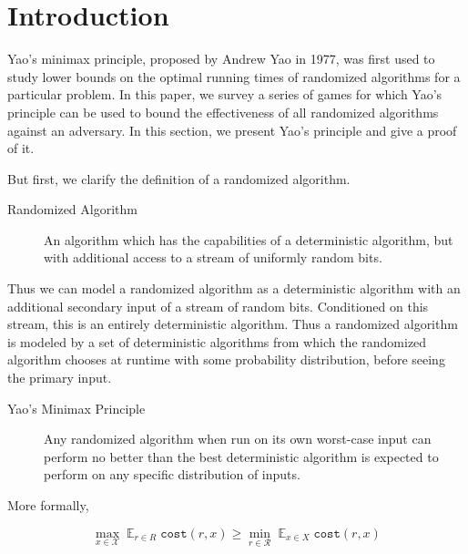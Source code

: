 \newcommand{\Expected}{\displaystyle\mathop{\mathds{E}}}
\newcommand{\argmin}{\displaystyle\mathop{\text{arg\;min}}}

\section{Introduction}

Yao's minimax principle, proposed by Andrew Yao in 1977, was first used to study lower bounds on the optimal running times of randomized algorithms for a particular problem. In this paper, we survey a series of games for which Yao's principle can be used to bound the effectiveness of all randomized algorithms against an adversary.
In this section, we present Yao's principle and give a proof of it.

But first, we clarify the definition of a randomized algorithm.

\begin{description}
	\item[Randomized Algorithm] An algorithm which has the capabilities of a deterministic algorithm, but with additional access to a stream of uniformly random bits.
\end{description}

Thus we can model a randomized algorithm as a deterministic algorithm with an additional secondary input of a stream of random bits. Conditioned on this stream, this is an entirely deterministic algorithm. Thus a randomized algorithm is modeled by a set of deterministic algorithms from which the randomized algorithm chooses at runtime with some probability distribution, before seeing the primary input.


\begin{description}
	\item[Yao's Minimax Principle] Any randomized algorithm when run on its own worst-case input can perform no better than the best deterministic algorithm is expected to perform on any specific distribution of inputs.
\end{description}
More formally,

$$\max_{x \in \mathcal{X}} \Expected_{r \in R} \texttt{cost}(r, x) \geq \min_{r \in \mathcal{R}} \Expected_{x \in X} \texttt{cost}(r, x)$$


